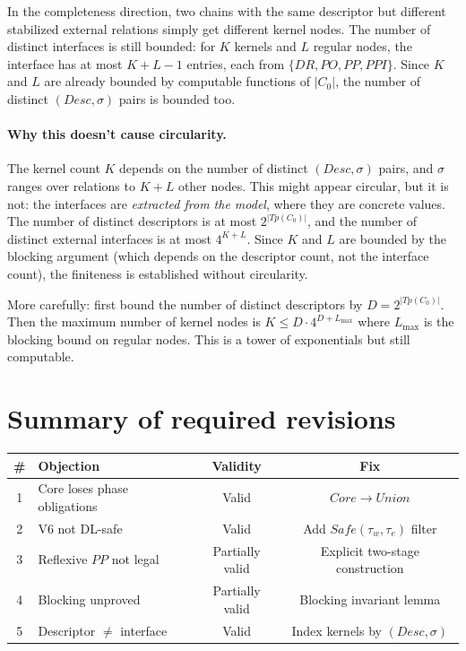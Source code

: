 \documentclass[11pt]{article}
\newcommand{\DR}{\mathit{DR}}
\newcommand{\PO}{\mathit{PO}}
\newcommand{\PP}{\mathit{PP}}
\newcommand{\PPI}{\mathit{PPI}}
\newcommand{\Tp}{\mathit{Tp}}
\newcommand{\Core}{\mathit{Core}}
\begin{document}
In the completeness direction, two chains with the same descriptor but
different stabilized external relations simply get different kernel
nodes.  The number of distinct interfaces is still bounded: for $K$
kernels and $L$ regular nodes, the interface has at most $K + L - 1$
entries, each from $\{\DR, \PO, \PP, \PPI\}$.  Since $K$ and $L$ are
already bounded by computable functions of $|C_0|$, the number of
distinct $(Desc, \sigma)$ pairs is bounded too.

\paragraph{Why this doesn't cause circularity.}
The kernel count $K$ depends on the number of distinct $(Desc, \sigma)$
pairs, and $\sigma$ ranges over relations to $K + L$ other nodes.  This
might appear circular, but it is not: the interfaces are \emph{extracted
from the model}, where they are concrete values.  The number of distinct
descriptors is at most $2^{|\Tp(C_0)|}$, and the number of distinct
external interfaces is at most $4^{K+L}$.  Since $K$ and $L$ are bounded
by the blocking argument (which depends on the descriptor count, not the
interface count), the finiteness is established without circularity.

More carefully: first bound the number of distinct descriptors by
$D = 2^{|\Tp(C_0)|}$.  Then the maximum number of kernel nodes is $K \le
D \cdot 4^{D + L_{\max}}$ where $L_{\max}$ is the blocking bound on
regular nodes.  This is a tower of exponentials but still computable.

\section{Summary of required revisions}

\begin{center}
\begin{tabular}{clcc}
\hline
\textbf{\#} & \textbf{Objection} & \textbf{Validity} & \textbf{Fix} \\
\hline
1 & Core loses phase obligations & Valid &
  $\Core \to \mathit{Union}$ \\
2 & V6 not DL-safe & Valid &
  Add $\mathit{Safe}(\tau_w, \tau_e)$ filter \\
3 & Reflexive $\PP$ not legal & Partially valid &
  Explicit two-stage construction \\
4 & Blocking unproved & Partially valid &
  Blocking invariant lemma \\
5 & Descriptor $\ne$ interface & Valid &
  Index kernels by $(Desc, \sigma)$ \\
\hline
\end{tabular}
\end{center}
\end{document}
